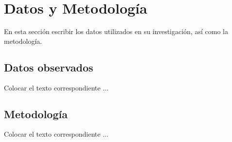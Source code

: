 \chapter{Datos y Metodología}
\label{cap3}

En esta sección escribir los datos utilizados en su investigación, así como la metodología.


\section{Datos observados}
Colocar el texto correspondiente ...

\section{Metodología}

Colocar el texto correspondiente ...
